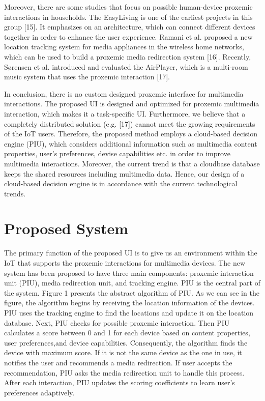 \documentclass[runningheads,a4paper]{llncs}
\begin{document}
Moreover, there are some studies that focus on possible human-device proxemic interactions in households. The EasyLiving is one of the earliest projects
in this group [15]. It emphasizes on an architecture, which can connect different
devices together in order to enhance the user experience. Ramani et al. proposed
a new location tracking system for media appliances in the wireless home networks, which can be used to build a proxemic media redirection system [16].
Recently, Sørensen et al. introduced and evaluated the AirPlayer, which is a
multi-room music system that uses the proxemic interaction [17].



In conclusion, there is no custom designed proxemic interface for multimedia
interactions. The proposed UI is designed and optimized for proxemic multimedia interaction, which makes it a task-specific UI. Furthermore, we believe that
a completely distributed solution (e.g. [17]) cannot meet the growing requirements of the IoT users. Therefore, the proposed method employs a cloud-based
decision engine (PIU), which considers additional information such as multimedia content properties, user’s preferences, devise capabilities etc. in order to
improve multimedia interactions. Moreover, the current trend is that a cloudbase database keeps the shared resources including multimedia data. Hence, our
design of a cloud-based decision engine is in accordance with the current technological trends.

\section{Proposed System}
The primary function of the proposed UI is to give us  an environment within the
IoT that supports the proxemic interactions for multimedia devices. The new system has been proposed to have three main components: proxemic interaction unit (PIU), media redirection unit, and tracking engine. PIU is the central part of the system.
Figure 1 presents the abstract algorithm of PIU. As we can see in the figure, the
algorithm begins by receiving the location information of the devices. PIU uses
the tracking engine to find the locations and update it on the location database.
Next, PIU checks for possible proxemic interaction. Then PIU calculates a score
between 0 and 1 for each device based on content properties, user preferences,and device capabilities. Consequently, the algorithm finds the device with maximum score. If it is not the same device as the one in use, it notifies the user and
recommends a media redirection. If user accepts the recommendation, PIU asks
the media redirection unit to handle this process. After each interaction, PIU
updates the scoring coefficients to learn user’s preferences adaptively.
\end{document}
